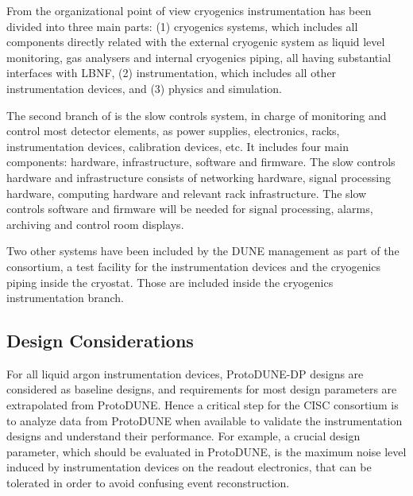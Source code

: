 From the organizational point of view
cryogenics instrumentation has been divided into three main parts: (1) cryogenics systems, which includes all components directly related with the external cryogenic system as
liquid level monitoring, gas analysers and internal cryogenics piping, all having substantial interfaces with LBNF, (2) \lar  instrumentation, which includes all
other instrumentation devices, and (3) physics and simulation.


The second branch of  is the slow controls system, in charge of monitoring and control most detector elements, as power supplies, electronics, racks, instrumentation devices,
calibration devices, etc. It includes four main components: hardware, infrastructure,
software and firmware. The slow controls hardware and infrastructure consists of
networking hardware, signal processing hardware, computing hardware and relevant
rack infrastructure. The slow controls software and firmware will be needed for
signal processing, alarms, archiving and control room displays.

Two other systems have been included by the DUNE management as part of the  consortium,
a test facility for the instrumentation devices and the cryogenics piping inside the cryostat.
Those are included inside the cryogenics instrumentation branch.



\subsection{Design Considerations}
\label{sec:fddp-slow-cryo-des-consid}


For all liquid argon instrumentation devices, ProtoDUNE-DP designs are
considered as baseline designs, and requirements for most design
parameters are extrapolated from ProtoDUNE. Hence a critical step for
the CISC consortium is to analyze data from ProtoDUNE when available
to validate the instrumentation designs and understand their
performance. For example, a crucial design parameter, which should be evaluated in ProtoDUNE,
is the maximum noise level induced by instrumentation devices on the readout electronics, that can be tolerated 
in order to avoid confusing event reconstruction. 

